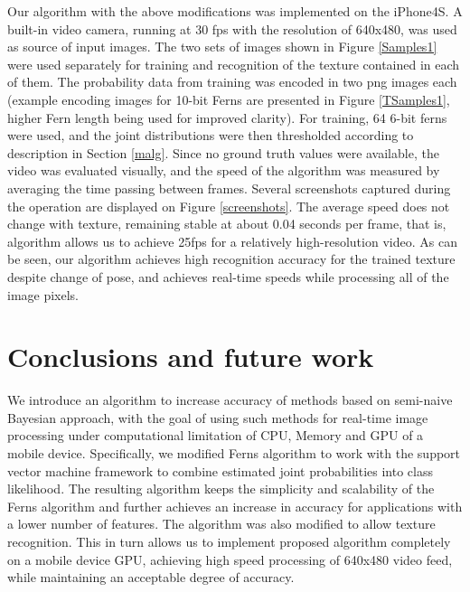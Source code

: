 \documentclass[10pt,twocolumn, a4paper]{article}
\begin{document}
Our algorithm with the above modifications was implemented on the iPhone4S. A built-in video camera, running at 30 fps with the resolution of 640x480, was used as source of input images. The two sets of images shown in Figure \ref{Samples1} were used separately  for training and recognition of the texture contained in each of them. The probability data from training was encoded in two png images each (example encoding images for 10-bit Ferns are presented in Figure \ref{TSamples1}, higher Fern length being used for improved clarity). For training, 64 6-bit ferns were used, and the joint distributions were then thresholded according to description in Section \ref{malg}. Since no ground truth values were available, the video was evaluated visually, and the speed of the algorithm was measured by averaging the time passing between frames. Several screenshots captured during the operation are displayed on Figure \ref {screenshots}. The average speed does not change with texture, remaining stable at about 0.04 seconds per frame, that is, algorithm allows us to achieve 25fps for a relatively high-resolution video.  As can be seen, our algorithm achieves high recognition accuracy for the trained texture despite change of pose, and achieves real-time speeds while processing all of the image pixels. 
\section{Conclusions and future work}
\label{conclusion}
We introduce an algorithm to increase accuracy of methods based on semi-naive Bayesian approach, with the goal of using such methods for real-time image processing under computational limitation of CPU, Memory and GPU of a mobile device. Specifically, we modified Ferns algorithm to work with the support vector machine framework to combine estimated joint probabilities into class likelihood. The resulting algorithm keeps the simplicity and scalability of the Ferns algorithm and further achieves an increase in accuracy for applications with a lower number of features. The algorithm was also modified to allow texture recognition. This in turn allows us to implement proposed algorithm completely on a mobile device GPU, achieving high speed processing of 640x480 video feed, while maintaining an acceptable degree of accuracy.




\end{document}
